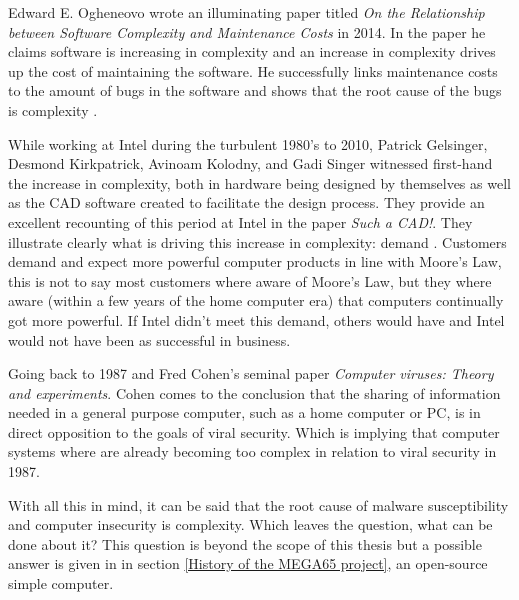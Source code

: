 Edward E. Ogheneovo wrote an illuminating paper titled \textit{On the Relationship between Software
Complexity and Maintenance Costs} in 2014. In the paper he claims software is increasing in complexity and an increase in complexity drives up the cost of maintaining the software. He successfully links  maintenance costs to the amount of bugs in the software and shows that the root cause of the bugs is complexity \cite{RN81}. 

While working at Intel during the turbulent 1980's to 2010, Patrick Gelsinger, Desmond Kirkpatrick,
Avinoam Kolodny, and Gadi Singer witnessed first-hand the increase in complexity, both in hardware being designed by themselves as well as the CAD software created to facilitate the design process. They provide an excellent recounting of this period at Intel in the paper \textit{Such a CAD!}. They illustrate clearly what is driving this increase in complexity: demand \cite{RN18}. Customers demand and expect more powerful computer products in line with Moore's Law, this is not to say most customers where aware of Moore's Law, but they where aware (within a few years of the home computer era) that computers continually got more powerful. If Intel didn't meet this demand, others would have and Intel would not have been as successful in business.

Going back to 1987 and Fred Cohen's seminal paper \textit{Computer viruses: Theory and experiments}. Cohen comes to the conclusion that the sharing of information needed in a general purpose computer, such as a home computer or PC, is in direct opposition to the goals of viral security. Which is implying that computer systems where are already becoming too complex in relation to viral security in 1987.

With all this in mind, it can be said that the root cause of malware susceptibility and computer insecurity is complexity. Which leaves the question, what can be done about it? This question is beyond the scope of this thesis but a possible answer is given in in section \ref{History of the MEGA65 project}, an open-source simple computer.
